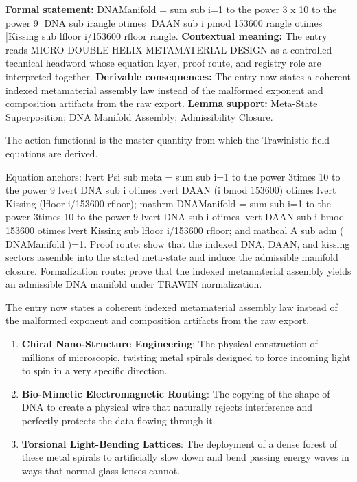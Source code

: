 \begingroup\footnotesize\setlength{\emergencystretch}{3em}\sloppy
\textbf{Formal statement:} DNAManifold = sum sub i=1 to the power 3 x 10 to the power 9 |DNA sub irangle otimes |DAAN sub i pmod 153600 rangle otimes |Kissing sub lfloor i/153600 rfloor rangle. \textbf{Contextual meaning:} The entry reads MICRO DOUBLE-HELIX METAMATERIAL DESIGN as a controlled technical headword whose equation layer, proof route, and registry role are interpreted together. \textbf{Derivable consequences:} The entry now states a coherent indexed metamaterial assembly law instead of the malformed exponent and composition artifacts from the raw export. \textbf{Lemma support:} Meta-State Superposition; DNA Manifold Assembly; Admissibility Closure.\par
\endgroup

The action functional is the master quantity from which the Trawinistic field equations are derived.

Equation anchors: lvert Psi sub meta = sum sub i=1 to the power 3times 10 to the power 9 lvert DNA sub i otimes lvert DAAN (i bmod 153600) otimes lvert Kissing (lfloor i/153600 rfloor); mathrm DNAManifold = sum sub i=1 to the power 3times 10 to the power 9 lvert DNA sub i otimes lvert DAAN sub i bmod 153600 otimes lvert Kissing sub lfloor i/153600 rfloor; and mathcal A sub adm ( DNAManifold )=1. Proof route: show that the indexed DNA, DAAN, and kissing sectors assemble into the stated meta-state and induce the admissible manifold closure. Formalization route: prove that the indexed metamaterial assembly yields an admissible DNA manifold under TRAWIN normalization.

The entry now states a coherent indexed metamaterial assembly law instead of the malformed exponent and composition artifacts from the raw export.
\endgroup

\begin{enumerate}[leftmargin=1.6em,itemsep=6pt,topsep=4pt]
\item \textbf{Chiral Nano-Structure Engineering}: The physical construction of millions of microscopic, twisting metal spirals designed to force incoming light to spin in a very specific direction.
\item \textbf{Bio-Mimetic Electromagnetic Routing}: The copying of the shape of DNA to create a physical wire that naturally rejects interference and perfectly protects the data flowing through it.
\item \textbf{Torsional Light-Bending Lattices}: The deployment of a dense forest of these metal spirals to artificially slow down and bend passing energy waves in ways that normal glass lenses cannot.
\end{enumerate}


